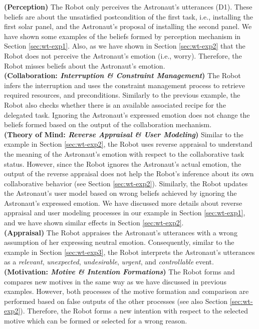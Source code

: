 \noindent\textbf{(Perception)} The Robot only perceives the Astronaut's
utterances (D1). These beliefs are about the unsatisfied postcondition of the
first task, i.e., installing the first solar panel, and the Astronaut's proposal
of installing the second panel. We have shown some examples of the beliefs
formed by perception mechanism in Section \ref{sec:wt-exp1}. Also, as we have
shown in Section \ref{sec:wt-exp2} that the Robot does not perceive the
Astronaut's emotion (i.e., worry). Therefore, the Robot misses beliefs about the
Astronaut's emotion.\\

\noindent\textbf{(Collaboration: \textit{Interruption \& Constraint
Management})} The Robot infers the interruption and uses the constraint
management process to retrieve required resources, and preconditions. Similarly
to the previous example, the Robot also checks whether there is an available
associated recipe for the delegated task. Ignoring the Astronaut's expressed
emotion does not change the beliefs formed based on the output of the
collaboration mechanism.\\

\noindent\textbf{(Theory of Mind: \textit{Reverse Appraisal \& User Modeling})}
Similar to the example in Section \ref{sec:wt-exp2}, the Robot uses reverse
appraisal to understand the meaning of the Astronaut's emotion with respect to
the collaborative task status. However, since the Robot ignores the Astronaut's
actual emotion, the output of the reverse appraisal does not help the Robot's
inference about its own collaborative behavior (see Section \ref{sec:wt-exp2}).
Similarly, the Robot updates the Astronaut's user model based on wrong beliefs
achieved by ignoring the Astronaut's expressed emotion. We have discussed more
details about reverse appraisal and user modeling processes in our example in
Section \ref{sec:wt-exp1}, and we have shown similar effects in Section
\ref{sec:wt-exp2}.\\

\noindent\textbf{(Appraisal)} The Robot appraises the Astronaut's utterances
with a wrong assumption of her expressing neutral emotion. Consequently, similar
to the example in Section \ref{sec:wt-exp3}, the Robot interprets the
Astronaut's utterances as a \textit{relevant}, \textit{unexpected},
\textit{undesirable}, \textit{urgent}, and \textit{controllable} event.\\

\noindent\textbf{(Motivation: \textit{Motive \& Intention Formations})} The
Robot forms and compares new motives in the same way as we have discussed in
previous examples. However, both processes of the motive formation and
comparison are performed based on false outputs of the other processes (see also
Section \ref{sec:wt-exp2}). Therefore, the Robot forms a new intention with
respect to the selected motive which can be formed or selected for a wrong
reason.\\

